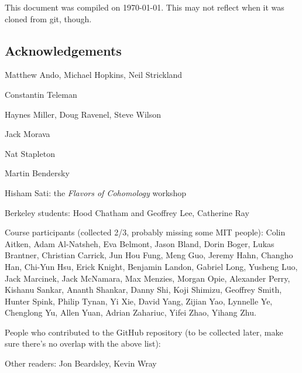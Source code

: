 


\newpage

This document was compiled on \today. This may not reflect when it was cloned from git, though.

\subsection*{Acknowledgements}

Matthew Ando, Michael Hopkins, Neil Strickland

Constantin Teleman

Haynes Miller, Doug Ravenel, Steve Wilson

Jack Morava

Nat Stapleton

Martin Bendersky



Hisham Sati: the \textit{Flavors of Cohomology} workshop

Berkeley students: Hood Chatham and Geoffrey Lee, Catherine Ray

Course participants (collected 2/3, probably missing some MIT people): Colin Aitken, Adam Al-Natsheh, Eva Belmont, Jason Bland, Dorin Boger, Lukas Brantner, Christian Carrick, Jun Hou Fung, Meng Guo, Jeremy Hahn, Changho Han, Chi-Yun Hsu, Erick Knight, Benjamin Landon, Gabriel Long, Yusheng Luo, Jack Marcinek, Jack McNamara, Max Menzies, Morgan Opie, Alexander Perry, Kishanu Sankar, Ananth Shankar, Danny Shi, Koji Shimizu, Geoffrey Smith, Hunter Spink, Philip Tynan, Yi Xie, David Yang, Zijian Yao, Lynnelle Ye, Chenglong Yu, Allen Yuan, Adrian Zahariuc, Yifei Zhao, Yihang Zhu.

People who contributed to the GitHub repository (to be collected later, make sure there's no overlap with the above list): 

Other readers: Jon Beardsley, Kevin Wray

